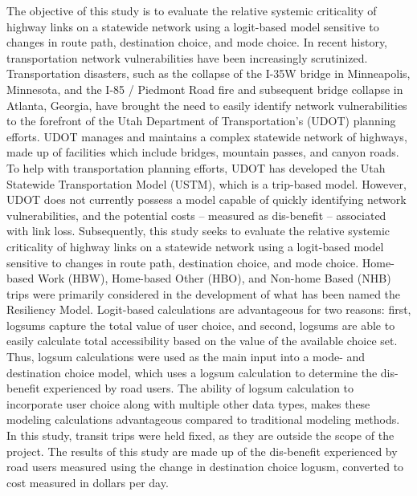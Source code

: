 \afterpage{\cleardoublepage}

The objective of this study is to evaluate the relative systemic
criticality of highway links on a statewide network using a logit-based model
sensitive to changes in route path, destination choice, and mode choice.
In recent history, transportation network vulnerabilities have been increasingly
scrutinized. Transportation disasters, such as the collapse of the I-35W
bridge in Minneapolis, Minnesota, and the I-85 / Piedmont Road fire
and subsequent bridge collapse in Atlanta, Georgia, have brought the need to easily identify
network vulnerabilities to the forefront of the Utah Department of Transportation's
(UDOT) planning efforts. UDOT manages and maintains a complex statewide network of highways,
made up of facilities which include bridges, mountain passes, and canyon roads.
To help with transportation planning efforts, UDOT has developed the Utah
Statewide Transportation Model (USTM), which is a trip-based model. However,
UDOT does not currently possess a model capable of quickly identifying network
vulnerabilities, and the potential costs -- measured as dis-benefit -- associated with link loss.
Subsequently, this study seeks to evaluate the relative systemic
criticality of highway links on a statewide network using a logit-based model
sensitive to changes in route path, destination choice, and mode choice.
Home-based Work (HBW), Home-based Other (HBO), and Non-home Based (NHB)
trips were primarily considered in the development of what has been named the
Resiliency Model. Logit-based calculations are advantageous for two reasons: first,
logsums capture the total value of user choice, and second, logsums are able to easily
calculate total accessibility based on the value of the available choice set. Thus, logsum
calculations were used as the main input into a mode- and destination choice
model, which uses a logsum calculation to determine the dis-benefit experienced
by road users. The ability of logsum calculation to incorporate user choice
along with multiple other data types, makes these modeling calculations
advantageous compared to traditional modeling methods. In this study, transit trips were held
fixed, as they are outside the scope of the project. The results of this study
are made up of the dis-benefit experienced by road users measured using the
change in destination choice logusm, converted to cost measured in dollars per day.
